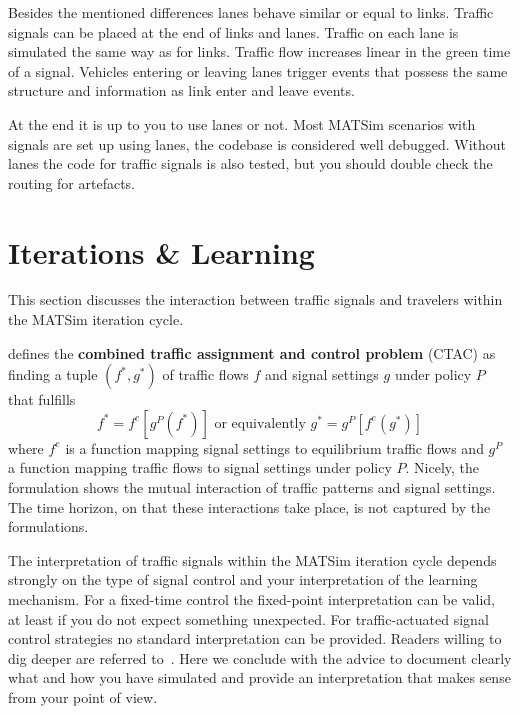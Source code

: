 Besides the mentioned differences lanes behave similar or equal to links.  
Traffic signals can be placed at the end of links and lanes. 
Traffic on each lane is simulated the same way as for links. 
Traffic flow increases linear in the green time of a signal. 
Vehicles entering or leaving lanes trigger events that possess the same structure and information as link enter and leave events.

At the end it is up to you to use lanes or not. 
Most MATSim scenarios with signals are set up using lanes, the codebase is considered well debugged. 
Without lanes the code for traffic signals is also tested, but you should double check the routing for artefacts. 

\section{Iterations \& Learning}
\label{sec:signals_iterations_learning}

This section discusses the interaction between traffic signals and travelers within the MATSim iteration cycle. 

\citet{Meneguzzer1997ModelReviewTrafficAssignmentSignalControl} defines the {\bf combined traffic assignment and control problem} (CTAC) as finding a tuple $(f^{*}, g^{*})$ of traffic flows $f$ and signal settings $g$ under policy $P$ that fulfills  
\[
f^{*} = f^{e}[g^{P}(f^{*})] \mbox{  or  equivalently } g^{*} = g^{P}[f^{e}(g^{*})]
\]
where $f^{e}$ is a function mapping signal settings to equilibrium traffic flows and $g^{P}$ a function mapping traffic flows to signal settings under policy $P$.  
Nicely, the formulation shows the mutual interaction of traffic patterns and signal settings. 
The time horizon, on that these interactions take place, is not captured by the formulations. 

The interpretation of traffic signals within the MATSim iteration cycle depends strongly on the type of signal control and your interpretation of the learning mechanism. 
For a fixed-time control the fixed-point interpretation can be valid, at least if you do not expect something unexpected. 
For traffic-actuated signal control strategies no standard interpretation can be provided. 
Readers willing to dig deeper are referred to~\citet[pp.~75][]{Grether2014PhD}.  
Here we conclude with the advice to document clearly what and how you have simulated and provide an interpretation that makes sense from your point of view.    

